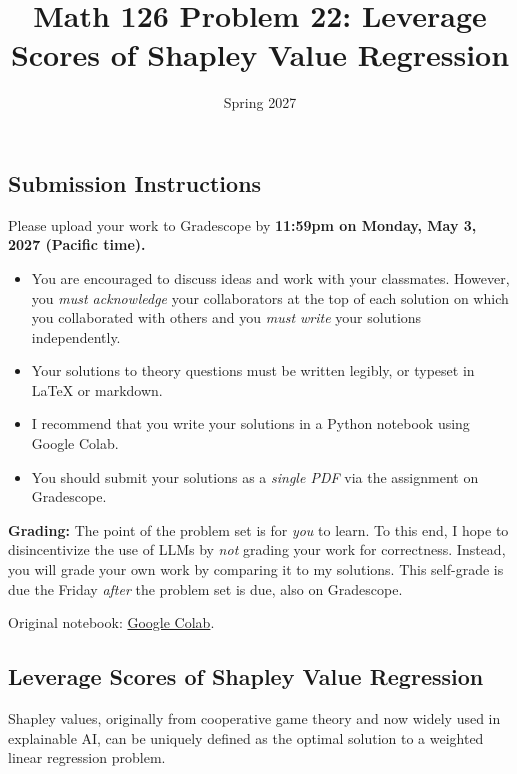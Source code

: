\documentclass{article}
\title{Math 126 Problem 22: Leverage Scores of Shapley Value Regression}
\author{} %
\date{Spring 2027}
\begin{document}
\maketitle

\hypertarget{submission-instructions}{%
\subsection*{Submission Instructions}\label{submission-instructions}}

Please upload your work to Gradescope by \textbf{11:59pm on Monday, May 3, 2027 (Pacific time).}

\begin{itemize}
\item
  You are encouraged to discuss ideas and work with your classmates. However, you \emph{must acknowledge} your collaborators at the top of each solution on which you collaborated with others and you \emph{must write} your solutions independently.
\item
  Your solutions to theory questions must be written legibly, or typeset in LaTeX or markdown.
\item
  I recommend that you write your solutions in a Python notebook using Google Colab.
\item
  You should submit your solutions as a \emph{single PDF} via the assignment on Gradescope.
\end{itemize}

\textbf{Grading:} The point of the problem set is for \emph{you} to learn. To this end, I hope to disincentivize the use of LLMs by \emph{not} grading your work for correctness. Instead, you will grade your own work by comparing it to my solutions. This self-grade is due the Friday \emph{after} the problem set is due, also on Gradescope.

\noindent Original notebook: \href{https://colab.research.google.com/drive/1S1VpnBCQBTEnzVzdkMH-6f-qAWz_mpqE?usp=sharing}{Google Colab}.

\hypertarget{leverage-scores-of-shapley-value-regression}{%
\subsection*{Leverage Scores of Shapley Value Regression}\label{leverage-scores-of-shapley-value-regression}}

Shapley values, originally from cooperative game theory and now widely used in explainable AI, can be uniquely defined as the optimal solution to a weighted linear regression problem.
\end{document}
